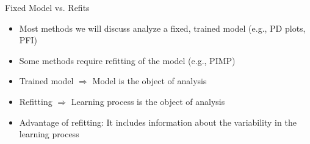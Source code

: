 \documentclass[11pt,compress,t,notes=noshow, aspectratio=169, xcolor=table]{beamer}
\begin{document}


\begin{frame}{Fixed Model vs. Refits}
	\begin{itemize}
		\itemsep1em
		\item Most methods we will discuss analyze a fixed, trained model (e.g., PD plots, PFI)
		\item Some methods require refitting of the model (e.g., PIMP)
		\item Trained model $\Rightarrow$ Model is the object of analysis
		\item Refitting $\Rightarrow$ Learning process is the object of analysis
		\item Advantage of refitting: It includes information about the variability in the learning process
	\end{itemize}
\end{frame}
\end{document}
